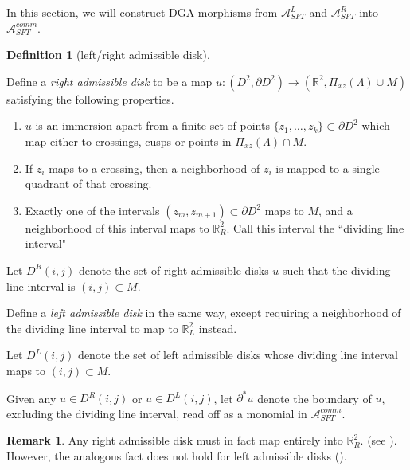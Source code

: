 \documentclass[a4paper,final, reqno]{amsart}
\theoremstyle{plain}
\theoremstyle{definition}
\newtheorem{Def}[Th]{Definition}
\newtheorem{Rem}[Th]{Remark}
\newcommand{\A}{\mathcal{A}}
\begin{document}
	In this section, we will construct DGA-morphisms from $\A^L_{SFT}$ and $\A^R_{SFT}$ into $\A^{comm}_{SFT}$. 
	
	
	\begin{Def}[left/right admissible disk]\-\
		
		Define a \emph{right admissible disk} to be a map $u: (D^2, \partial D^2) \to (\mathbb{R}^2, \Pi_{xz}(\Lambda) \cup M)$ satisfying the following properties.
		
		\begin{enumerate}
			\item $u$ is an immersion apart from a finite set of points $\{z_1, \dots, z_k\} \subset \partial D^2$ which map either to crossings, cusps or points in $\Pi_{xz}(\Lambda) \cap M$.
			
			\item If $z_i$ maps to a crossing, then a neighborhood of $z_i$ is mapped to a single quadrant of that crossing.
			
			\item Exactly one of the intervals $(z_m, z_{m+1}) \subset \partial D^2$ maps to $M$, and a neighborhood of this interval maps to $\mathbb{R}^2_R$. Call this interval the ``dividing line interval"
		\end{enumerate}
		
		Let $D^R(i,j)$ denote the set of right admissible disks $u$ such that the dividing line interval is $(i,j) \subset M$.
		
		
		
		
		Define a \emph{left admissible disk} in the same way, except requiring a neighborhood of the dividing line interval to map to $\mathbb{R}^2_L$ instead.
		
		Let $D^L(i,j)$ denote the set of left admissible disks whose dividing line interval maps to $(i,j) \subset M$.
		
		Given any $u \in D^R(i,j)$ or $u\in D^L(i,j)$, let $\partial^*u$ denote the boundary of $u$, excluding the dividing line interval, read off as a monomial in $\A^{comm}_{SFT}$.
		
	\end{Def}
	
	
	\begin{Rem}
		Any right admissible disk must in fact map entirely into $\mathbb{R}^2_R$. (see ). However, the analogous fact does not hold for left admissible disks ().
	\end{Rem}
	
\end{document}
